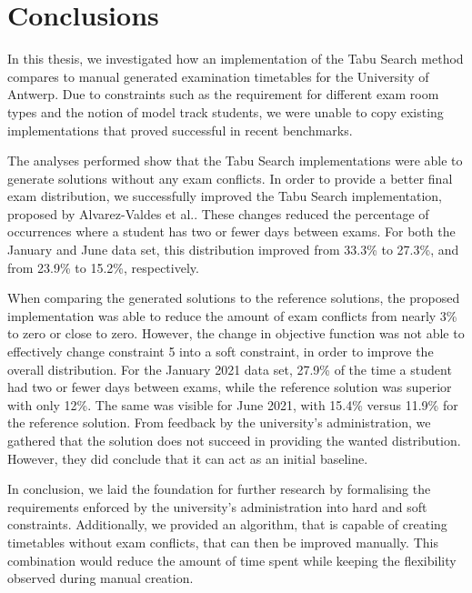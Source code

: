 
\section{Conclusions}\label{sec:conclusion}

 In this thesis, we investigated how an implementation of the Tabu Search method compares to manual generated examination timetables for the University of Antwerp. Due to constraints such as the requirement for different exam room types and the notion of model track students, we were unable to copy existing implementations that proved successful in recent benchmarks. 

 The analyses performed show that the Tabu Search implementations were able to generate solutions without any exam conflicts. In order to provide a better final exam distribution, we successfully improved the Tabu Search implementation, proposed by Alvarez-Valdes et al.\cite{alvarez1997}. These changes reduced the percentage of occurrences where a student has two or fewer days between exams. For both the January and June data set, this distribution improved from 33.3\% to 27.3\%, and from 23.9\% to 15.2\%, respectively.
 
When comparing the generated solutions to the reference solutions, the proposed implementation was able to reduce the amount of exam conflicts from nearly 3\% to zero or close to zero. However, the change in objective function was not able to effectively change constraint 5 into a soft constraint, in order to improve the overall distribution. For the January 2021 data set, 27.9\% of the time a student had two or fewer days between exams, while the reference solution was superior with only 12\%. The same was visible for June 2021, with 15.4\% versus 11.9\% for the reference solution. From feedback by the university's administration, we gathered that the solution does not succeed in providing the wanted distribution. However, they did conclude that it can act as an initial baseline.

In conclusion, we laid the foundation for further research by formalising the requirements enforced by the university's administration into hard and soft constraints. Additionally, we provided an algorithm, that is capable of creating timetables without exam conflicts, that can then be improved manually. This combination would reduce the amount of time spent while keeping the flexibility observed during manual creation.

